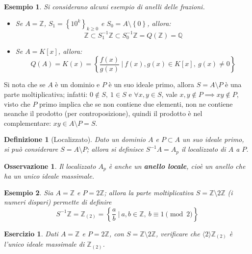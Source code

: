 \documentclass[12pt]{scrartcl}
\theoremstyle{style}
\newtheorem{esempio}{Esempio}[section]
\newtheorem{definizione}{Definizione}[section]
\newtheorem{osservazione}{Osservazione}[section]
\newtheorem{esercizio}{Esercizio}[section]
\numberwithin{equation}{subsection}
\begin{document}
\begin{esempio}
	Si considerano alcuni esempio di anelli delle frazioni.
	\begin{itemize}
		\item Se $A = \mathbb{Z}$, $S_1 = \left\{ 10^k \right\} _{k\ge 0} $ e $S_0 = A \setminus\left\{ 0 \right\} $, allora:
			\[
			\mathbb{Z} \subset S_1^{-1}\mathbb{Z}\subset S_0^{-1}\mathbb{Z}= Q(\mathbb{Z}) =  \mathbb{Q}
			\] 
		\item Se $A = K[x]$, allora:
			\[
				Q(A)= K(x) = \left\{ \frac{f(x)}{g(x)}\ \bigg\lvert \ f(x) , g(x) \in K[x]  , \ g(x) \neq 0\right\}
			\] 
	\end{itemize}
\end{esempio}
\noindent Si nota che se $A$ \`e un dominio e $P$ \`e un suo ideale primo, allora $S = A \setminus P$ \`e una parte moltiplicativa; infatti: $0 \not \in S, \ 1 \in S$ e $\forall x,y \in S$, vale $x,y \not \in P \implies xy \not \in P$, visto che $P$ primo implica che se non contiene due elementi, non ne contiene neanche il prodotto (per controposizione), quindi il prodotto \`e nel complementare: $xy \in A \setminus P = S$.
\begin{definizione}
	[Localizzato]
		Dato un dominio $A$ e $P \subset A$ un suo ideale primo, si pu\`o considerare $S = A\setminus P$; allora si definisce $S^{-1}A = A_p$ il \textit{localizzato} di $A$ a $P$.
\end{definizione}
\begin{osservazione}
Il localizzato $A_p$ \`e anche un \textbf{anello locale}, cio\`e un anello che ha un unico ideale massimale.
\end{osservazione}
\begin{esempio}
Sia $A = \mathbb{Z}$ e $P = 2\mathbb{Z}$; allora la parte moltiplicativa $S = \mathbb{Z} \setminus 2\mathbb{Z}$ (i numeri dispari) permette di definire
\[
S^{-1}\mathbb{Z} = \mathbb{Z}_{(2)} = \left\{ \frac{a}{b} \ \bigg\lvert \ a, b\in \mathbb{Z}, \ b \equiv 1  \pmod{2}  \right\} 
\] 
\end{esempio}
\begin{esercizio}
	Dati $A = \mathbb{Z}$ e $P =2\mathbb{Z}$, con $S = \mathbb{Z} \setminus 2\mathbb{Z}$, verificare che $\langle 2 \rangle\mathbb{Z}_{(2)}$ \`e l'unico ideale massimale di $\mathbb{Z}_{(2)} $.
\end{esercizio}
\end{document}
